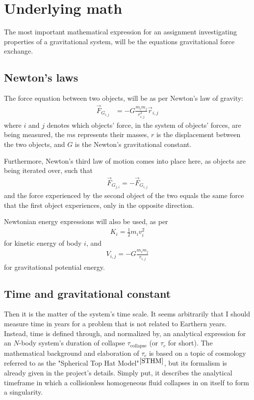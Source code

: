 \documentclass[11pt,a4paper,notitlepage,twocolumn]{article}
\begin{document}
\section{Underlying math}
The most important mathematical expression for an assignment investigating properties of a gravitational system, will be the equations gravitational force exchange.
\subsection{Newton's laws}
The force equation between two objects, will be as per Newton's law of gravity:
\begin{align}\label{eq:gravlaw}
\vec{F}_{G_{i,j}} &= -G\frac{m_i m_j}{r^3_{i,j}}\vec{r}_{i,j}
\end{align}
where $i$ and $j$ denotes which objects' force, in the system of objects' forces, are being measured, the $m$s represents their masses, $r$ is the displacement between the two objects, and $G$ is the Newton's gravitational constant.

Furthermore, Newton's third law of motion comes into place here, as objects are being iterated over, such that
\begin{align}\label{eq:thirdlaw}
\vec{F}_{G_{j,i}} = -\vec{F}_{G_{i,j}}
\end{align}
and the force experienced by the second object of the two equals the same force that the first object experiences, only in the opposite direction.

Newtonian energy expressions will also be used, as per
\begin{align}
K_i = \frac{1}{2}m_i v^2_i \label{eq:KinEn}
\end{align}
for kinetic energy of body $i$, and
\begin{align}
V_{i,j} = -G\frac{m_i m_j}{r_{i,j}} \label{eq:PotEn}
\end{align}
for gravitational potential energy.

\subsection{Time and gravitational constant}
Then it is the matter of the system's time scale. It seems arbitrarily that I should measure time in years for a problem that is not related to Earthern years. Instead, time is defined through, and normalized by, an analytical expression for an $N$-body system's duration of collapse $\tau_{\text{collapse}}$ (or $\tau_c$ for short). The mathematical background and elaboration of $\tau_c$ is based on a topic of cosmology referred to as the "Spherical Top Hat Model"$^{\cite{STHM}}$, but its formalism is already given in the project's details. Simply put, it describes the analytical timeframe in which a collisionless homogeneous fluid collapses in on itself to form a singularity.
\end{document}
